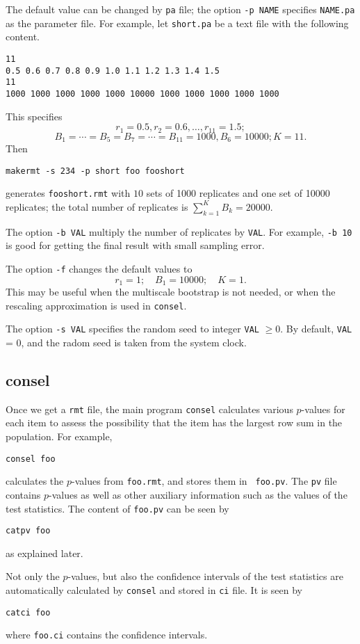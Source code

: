 \documentclass[12pt]{article}
\begin{document}
The default value can be changed by {\tt pa} file; the option {\tt -p
NAME} specifies {\tt NAME.pa} as the parameter file.  For example, let
{\tt short.pa} be a text file with the following content.
\begin{verbatim}
11
0.5 0.6 0.7 0.8 0.9 1.0 1.1 1.2 1.3 1.4 1.5
11
1000 1000 1000 1000 1000 10000 1000 1000 1000 1000 1000
\end{verbatim}
This specifies
\[
 r_1=0.5, r_2=0.6,\ldots,r_{11}=1.5;
\]
\[
B_1=\cdots=B_5=B_7=\cdots=B_{11}=1000, B_6=10000; K=11.
\]
Then
\begin{verbatim}
makermt -s 234 -p short foo fooshort
\end{verbatim}
generates {\tt fooshort.rmt} with $10$ sets of 1000 replicates and one
set of 10000 replicates; the total number of replicates is $\sum_{k=1}^K
B_k= 20000$. 

The option {\tt -b VAL} multiply the number of replicates by {\tt VAL}. For
example, {\tt -b 10} is good for getting the final result with small
sampling error.

The option {\tt -f} changes the default values to
\[
 r_1 = 1;\quad B_1=10000;\quad K=1.
\]
This may be useful when the multiscale bootstrap is not needed, or when
the rescaling approximation is used in {\tt consel}.

The option {\tt -s VAL} specifies the random seed to integer {\tt VAL}
$\ge0$. By default, {\tt VAL} = 0, and the radom seed is taken from the
system clock.




\subsection{consel}

Once we get a {\tt rmt} file, the main program {\tt consel} calculates
various $p$-values for each item to assess the possibility that the item
has the largest row sum in the population. For example,
\begin{verbatim}
consel foo
\end{verbatim}
calculates the $p$-values from {\tt foo.rmt}, and stores them in {\tt
foo.pv}. The {\tt pv} file contains $p$-values as well as other
auxiliary information such as the values of the test statistics.  The
content of {\tt foo.pv} can be seen by
\begin{verbatim}
catpv foo
\end{verbatim}
as explained later.

Not only the $p$-values, but also the confidence intervals of the test
statistics are automatically calculated by {\tt consel} and stored in
{\tt ci} file. It is seen by
\begin{verbatim}
catci foo
\end{verbatim}
where {\tt foo.ci} contains the confidence intervals.
\end{document}
